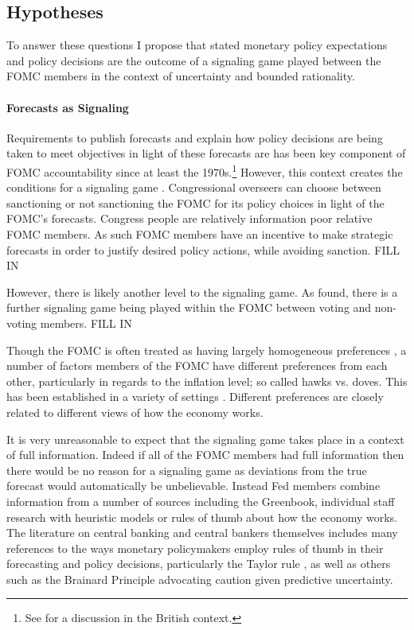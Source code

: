 \documentclass[a4paper]{article}\usepackage[]{graphicx}\usepackage[]{color}
\begin{document}
\subsection{Hypotheses}

To answer these questions I propose that stated monetary policy expectations and policy decisions are the outcome of a signaling game played between the FOMC members in the context of uncertainty and bounded rationality. 

\paragraph{Forecasts as Signaling}

Requirements to publish forecasts and explain how policy decisions are being taken to meet objectives in light of these forecasts are has been key component of FOMC accountability since at least the 1970s.\footnote{See \cite{Goodhart2001} for a discussion in the British context.} However, this context creates the conditions for a signaling game \cite[see][]{Crawford1982,Gibbons1992}. Congressional overseers can choose between sanctioning or not sanctioning the FOMC for its policy choices in light of the FOMC's forecasts. Congress people are relatively information poor relative FOMC members. As such FOMC members have an incentive to make strategic forecasts in order to justify desired policy actions, while avoiding sanction. FILL IN

However, there is likely another level to the signaling game. As \cite{Rulke2011} found, there is a further signaling game being played within the FOMC between voting and non-voting members. FILL IN

Though the FOMC is often treated as having largely homogeneous preferences \cite[for example][]{Clark2013}, a number of factors members of the FOMC have different preferences from each other, particularly in regards to the inflation level; so called hawks vs. doves. This has been established in a variety of settings \cite[see][]{adolph2013bankers,Hix2010}. Different preferences are closely related to different views of how the economy works. 

It is very unreasonable to expect that the signaling game takes place in a context of full information. Indeed if all of the FOMC members had full information then there would be no reason for a signaling game as deviations from the true forecast would automatically be unbelievable. Instead Fed members combine information from a number of sources including the Greenbook, individual staff research with heuristic models or rules of thumb about how the economy works. The literature on central banking and central bankers themselves includes many references to the ways monetary policymakers employ rules of thumb in their forecasting and policy decisions, particularly the Taylor rule \cite[for example][]{Svensson2003,Orphanides2008,Leitemo2005}, as well as others such as the Brainard Principle \citep{Brainard1967} advocating caution given predictive uncertainty. 
\end{document}
